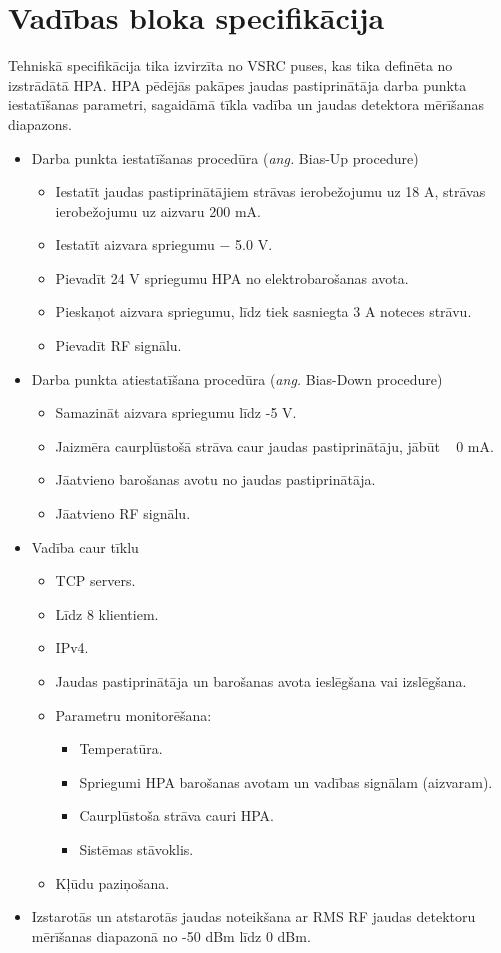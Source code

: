 \section{Vadības bloka specifikācija}
Tehniskā specifikācija tika izvirzīta no VSRC puses, kas tika definēta no izstrādātā HPA. HPA pēdējās pakāpes jaudas pastiprinātāja darba punkta iestatīšanas parametri, sagaidāmā tīkla vadība un jaudas detektora mērīšanas diapazons.
\begin{itemize}
    \item Darba punkta iestatīšanas procedūra (\textit{ang.} Bias-Up procedure)
    \begin{itemize}
        \item Iestatīt jaudas pastiprinātājiem strāvas ierobežojumu uz 18 A, strāvas ierobežojumu uz aizvaru 200 mA.
        \item Iestatīt aizvara spriegumu − 5.0 V.
        \item Pievadīt 24 V spriegumu HPA no elektrobarošanas avota.
        \item Pieskaņot aizvara spriegumu, līdz tiek sasniegta 3 A noteces strāvu.
        \item Pievadīt RF signālu.
    \end{itemize}
    \item Darba punkta atiestatīšana procedūra (\textit{ang.} Bias-Down procedure)
    \begin{itemize}
        \item Samazināt aizvara spriegumu līdz -5 V.
        \item Jaizmēra caurplūstošā strāva caur jaudas pastiprinātāju, jābūt ~ 0 mA.
        \item Jāatvieno barošanas avotu no jaudas pastiprinātāja.
        \item Jāatvieno RF signālu.
    \end{itemize}
    \item Vadība caur tīklu
    \begin{itemize}
        \item TCP servers.
        \item Līdz 8 klientiem.
        \item IPv4.
        \item Jaudas pastiprinātāja un barošanas avota ieslēgšana vai izslēgšana.
        \item Parametru monitorēšana:
        \begin{itemize}
            \item Temperatūra. 
            \item Spriegumi HPA barošanas avotam un vadības signālam (aizvaram).
            \item Caurplūstoša strāva cauri HPA.
            \item Sistēmas stāvoklis.
        \end{itemize}
        \item Kļūdu paziņošana. 
    \end{itemize}
    \item Izstarotās un atstarotās jaudas noteikšana ar RMS RF jaudas detektoru mērīšanas diapazonā no -50 dBm līdz 0 dBm.
\end{itemize}

